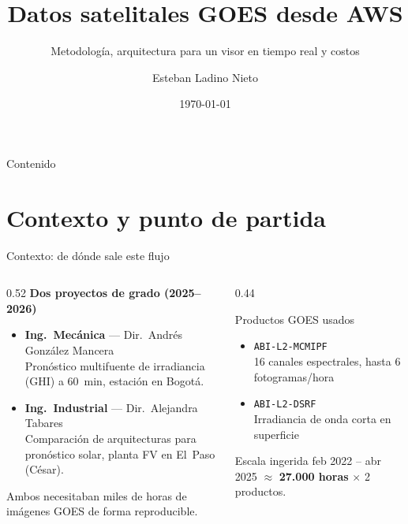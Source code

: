 \documentclass[10pt,aspectratio=169]{beamer}
\title[GOES en AWS]{Datos satelitales GOES desde AWS}
\subtitle{Metodología, arquitectura para un visor en tiempo real y costos}
\author{Esteban Ladino Nieto}
\institute[Uniandes]{Universidad de los Andes \\ \small Ing.\ Industrial \& Ing.\ Mecánica}
\date{\today}
\begin{document}
\begin{frame}
  \titlepage
\end{frame}

\begin{frame}{Contenido}
  \tableofcontents
\end{frame}

\section{Contexto y punto de partida}

\begin{frame}{Contexto: de dónde sale este flujo}
  \begin{columns}[T]
    \begin{column}{0.52\textwidth}
      \textbf{Dos proyectos de grado (2025--2026)}
      \begin{itemize}
        \item \textbf{Ing.\ Mecánica} --- Dir.\ Andrés González Mancera\\
              \small Pronóstico multifuente de irradiancia (GHI) a 60~min,
              estación en Bogotá.
        \item \textbf{Ing.\ Industrial} --- Dir.\ Alejandra Tabares\\
              \small Comparación de arquitecturas para pronóstico solar,
              planta FV en El~Paso (César).
      \end{itemize}
      \vspace{0.4em}
      Ambos necesitaban miles de horas de imágenes GOES de forma reproducible.
    \end{column}
    \begin{column}{0.44\textwidth}
      \begin{block}{Productos GOES usados}
        \begin{itemize}
          \item \texttt{ABI-L2-MCMIPF}\\
                \small 16 canales espectrales, hasta 6 fotogramas/hora
          \item \texttt{ABI-L2-DSRF}\\
                \small Irradiancia de onda corta en superficie
        \end{itemize}
      \end{block}
      \begin{alertblock}{Escala ingerida}
        \small feb 2022 -- abr 2025 $\approx$ \textbf{27.000 horas}
        $\times$ 2 productos.
      \end{alertblock}
    \end{column}
  \end{columns}
\end{frame}
\end{document}
